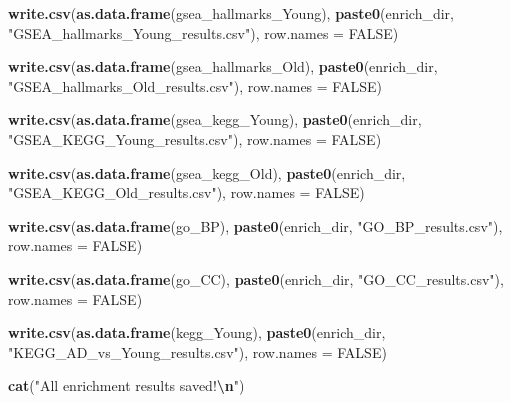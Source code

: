 \documentclass[
]{article}
\newenvironment{Shaded}{\begin{snugshade}}{\end{snugshade}}
\newcommand{\AttributeTok}[1]{\textcolor[rgb]{0.13,0.29,0.53}{#1}}
\newcommand{\ConstantTok}[1]{\textcolor[rgb]{0.56,0.35,0.01}{#1}}
\newcommand{\FunctionTok}[1]{\textcolor[rgb]{0.13,0.29,0.53}{\textbf{#1}}}
\newcommand{\NormalTok}[1]{#1}
\newcommand{\SpecialCharTok}[1]{\textcolor[rgb]{0.81,0.36,0.00}{\textbf{#1}}}
\newcommand{\StringTok}[1]{\textcolor[rgb]{0.31,0.60,0.02}{#1}}
\begin{document}
\begin{Shaded}
\begin{Highlighting}[]
\FunctionTok{write.csv}\NormalTok{(}\FunctionTok{as.data.frame}\NormalTok{(gsea\_hallmarks\_Young),}
          \FunctionTok{paste0}\NormalTok{(enrich\_dir, }\StringTok{"GSEA\_hallmarks\_Young\_results.csv"}\NormalTok{),}
          \AttributeTok{row.names =} \ConstantTok{FALSE}\NormalTok{)}

\FunctionTok{write.csv}\NormalTok{(}\FunctionTok{as.data.frame}\NormalTok{(gsea\_hallmarks\_Old),}
          \FunctionTok{paste0}\NormalTok{(enrich\_dir, }\StringTok{"GSEA\_hallmarks\_Old\_results.csv"}\NormalTok{),}
          \AttributeTok{row.names =} \ConstantTok{FALSE}\NormalTok{)}

\FunctionTok{write.csv}\NormalTok{(}\FunctionTok{as.data.frame}\NormalTok{(gsea\_kegg\_Young),}
          \FunctionTok{paste0}\NormalTok{(enrich\_dir, }\StringTok{"GSEA\_KEGG\_Young\_results.csv"}\NormalTok{),}
          \AttributeTok{row.names =} \ConstantTok{FALSE}\NormalTok{)}

\FunctionTok{write.csv}\NormalTok{(}\FunctionTok{as.data.frame}\NormalTok{(gsea\_kegg\_Old),}
          \FunctionTok{paste0}\NormalTok{(enrich\_dir, }\StringTok{"GSEA\_KEGG\_Old\_results.csv"}\NormalTok{),}
          \AttributeTok{row.names =} \ConstantTok{FALSE}\NormalTok{)}

\FunctionTok{write.csv}\NormalTok{(}\FunctionTok{as.data.frame}\NormalTok{(go\_BP),}
          \FunctionTok{paste0}\NormalTok{(enrich\_dir, }\StringTok{"GO\_BP\_results.csv"}\NormalTok{),}
          \AttributeTok{row.names =} \ConstantTok{FALSE}\NormalTok{)}

\FunctionTok{write.csv}\NormalTok{(}\FunctionTok{as.data.frame}\NormalTok{(go\_CC),}
          \FunctionTok{paste0}\NormalTok{(enrich\_dir, }\StringTok{"GO\_CC\_results.csv"}\NormalTok{),}
          \AttributeTok{row.names =} \ConstantTok{FALSE}\NormalTok{)}

\FunctionTok{write.csv}\NormalTok{(}\FunctionTok{as.data.frame}\NormalTok{(kegg\_Young),}
          \FunctionTok{paste0}\NormalTok{(enrich\_dir, }\StringTok{"KEGG\_AD\_vs\_Young\_results.csv"}\NormalTok{),}
          \AttributeTok{row.names =} \ConstantTok{FALSE}\NormalTok{)}

\FunctionTok{cat}\NormalTok{(}\StringTok{"All enrichment results saved!}\SpecialCharTok{\textbackslash{}n}\StringTok{"}\NormalTok{)}
\end{Highlighting}
\end{Shaded}
\end{document}

